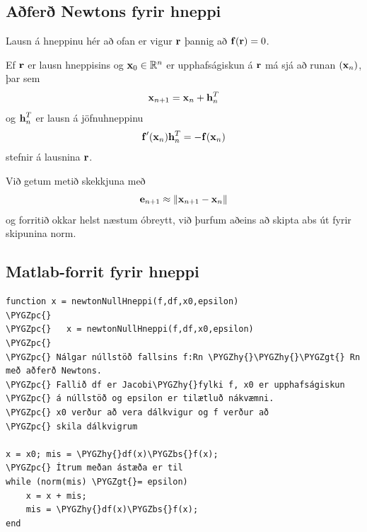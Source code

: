 \documentclass[letterpaper,10pt,icelandic]{sphinxmanual}
\def\PYGZbs{\char`\\}
\def\PYGZgt{\char`\>}
\def\PYGZpc{\char`\%}
\def\PYGZhy{\char`\-}
\begin{document}
\subsection{Aðferð Newtons fyrir hneppi}
\label{kafli08:afer-newtons-fyrir-hneppi}
Lausn á hneppinu hér að ofan er vigur \(\mbox{${\bf r}$}\) þannig að
\(\mbox{${\bf f}$}(\mbox{${\bf r}$}) =0\).

Ef \(\mbox{${\bf r}$}\) er lausn hneppisins og
\(\mbox{${\bf x}$}_0 \in {\mathbb  R}^n\) er upphafságiskun á
\(\mbox{${\bf r}$}\) má sjá að runan \((\mbox{${\bf x}$}_n)\),
þar sem
\begin{gather}
\begin{split}\mbox{${\bf x}$}_{n+1} = \mbox{${\bf x}$}_n + \mbox{${\bf h}$}_n^T\end{split}\notag
\end{gather}
og \(\mbox{${\bf h}$}_n^T\) er lausn á jöfnuhneppinu
\begin{gather}
\begin{split}\mbox{${\bf f}$}'(\mbox{${\bf x}$}_n) \mbox{${\bf h}$}_n^T = -\mbox{${\bf f}$}(\mbox{${\bf x}$}_n)\end{split}\notag
\end{gather}
stefnir á lausnina \(\mbox{${\bf r}$}\).

Við getum metið skekkjuna með
\begin{gather}
\begin{split}\mbox{${\bf e}$}_{n+1} \approx \| \mbox{${\bf x}$}_{n+1} - \mbox{${\bf x}$}_n \|\end{split}\notag
\end{gather}
og forritið okkar helst næstum óbreytt, við þurfum aðeins að skipta abs
út fyrir skipunina norm.


\subsection{Matlab-forrit fyrir hneppi}
\label{kafli08:matlab-forrit-fyrir-hneppi}
\begin{Verbatim}[commandchars=\\\{\}]
function x = newtonNullHneppi(f,df,x0,epsilon)
\PYGZpc{}
\PYGZpc{}   x = newtonNullHneppi(f,df,x0,epsilon)
\PYGZpc{}
\PYGZpc{} Nálgar núllstöð fallsins f:Rn \PYGZhy{}\PYGZhy{}\PYGZgt{} Rn með aðferð Newtons.
\PYGZpc{} Fallið df er Jacobi\PYGZhy{}fylki f, x0 er upphafságiskun
\PYGZpc{} á núllstöð og epsilon er tilætluð nákvæmni.
\PYGZpc{} x0 verður að vera dálkvigur og f verður að
\PYGZpc{} skila dálkvigrum

x = x0; mis = \PYGZhy{}df(x)\PYGZbs{}f(x);
\PYGZpc{} Ítrum meðan ástæða er til
while (norm(mis) \PYGZgt{}= epsilon)
    x = x + mis;
    mis = \PYGZhy{}df(x)\PYGZbs{}f(x);
end
\end{Verbatim}
\end{document}

